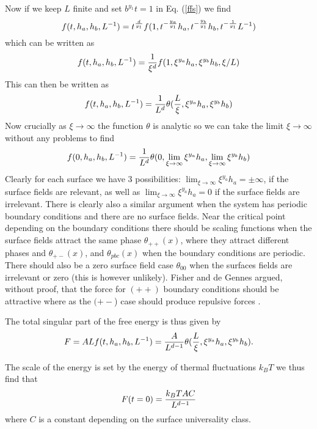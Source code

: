 Now if we keep $L$ finite and set $b^{y_1}t=1$ in Eq. (\ref{ffs}) we find
\begin{equation}
    f(t,h_a,h_b,L^{-1}) = t^{d\over y_1}f(1, t^{-{y_a\over y_1}} h_a, t^{-{y_b\over y_1}} h_b, t^{-{1\over y_1}}L^{-1})
    \label{ffs}
\end{equation}
which can be written as
\begin{equation}
    f(t,h_a,h_b,L^{-1}) = {1\over \xi^d}f(1,\xi^{y_a} h_a, \xi^{y_b} h_b, \xi/L)
\end{equation}
This can then be written as
\begin{equation}
    f(t,h_a,h_b,L^{-1}) = {1\over L^d}\theta({L\over \xi}, \xi^{y_a} h_a, \xi^{y_b} h_b)
\end{equation}
Now crucially as $\xi \to \infty$ the function $\theta$ is analytic so we can take the limit $\xi\to\infty$ without any problems to find
\begin{equation}
    f(0,h_a,h_b,L^{-1}) = {1\over L^d}\theta(0, \lim_{\xi\to \infty} \xi^{y_a} h_a,\lim_{\xi\to \infty}  \xi^{y_b} h_b)
\end{equation}
Clearly for each surface we have 3 possibilities: $\lim_{\xi\to \infty} \xi^{y_a} h_a = \pm \infty$, if the surface fields are relevant, as well as $\lim_{\xi\to \infty} \xi^{y_a} h_a = 0$ if the surface fields are irrelevant. There is clearly also a similar argument when the system has periodic boundary conditions and there are no surface fields. Near the critical point depending on the boundary conditions there should be scaling functions  when the surface fields attract the same phase $\theta_{++}(x)$, where they attract different phases and
$\theta_{+-}(x)$, and $\theta_{pbc}(x)$ when the boundary conditions are periodic. There should also be a zero surface field case $\theta_{00}$ when the surfaces fields are irrelevant or zero (this is however unlikely). Fisher and de Gennes argued, without proof, that the force for $(++)$ boundary conditions should be attractive where as the $(+-$) case should produce repulsive forces \cite{gambassi_casimir_2009,gambassi_critical_2009} .   

The total singular part of the free energy is thus given by
\begin{equation}
    F = ALf(t,h_a,h_b,L^{-1}) = {A\over L^{d-1}}\theta({L\over \xi}, \xi^{y_a} h_a, \xi^{y_b} h_b).
\end{equation}

The scale of the energy is set by the energy of thermal fluctuations $k_BT$ we thus find
that 
\begin{equation}
    F(t=0) = {k_BT A C\over L^{d-1}}
    \label{casfreeenergy}
\end{equation}
where $C$ is a constant depending on the surface universality class.


